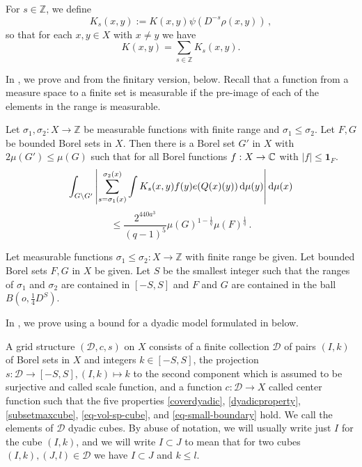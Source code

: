 For $s\in\mathbb{Z}$, we define
\begin{equation}\label{defks}
    K_s(x,y):=K(x,y)\psi(D^{-s}\rho(x,y))\,,
\end{equation}
so that for each $x, y \in X$ with $x\neq y$ we have
$$K(x,y)=\sum_{s\in\mathbb{Z}}K_s(x,y).$$

In , we prove  and 
from the finitary version,  below. Recall
that a function from a measure space to a finite set is measurable if the pre-image of each of the elements in the range is measurable.


\begin{proposition}
\label{finitary-Carleson}
\leanok
{}
Let ${\sigma_1},\sigma_2\colon X\to \mathbb{Z}$ be measurable functions with finite range and ${\sigma_1}\leq \sigma_2$.  Let $F,G$ be bounded Borel sets in $X$. Then there is a Borel set $G'$ in $X$ with $2\mu(G')\leq \mu(G)$ such that
for all Borel functions $f:X\to {\mathbb{C}}$ with $|f|\le \mathbf{1}_F$.
\begin{equation*}
    \int_{G \setminus G'} \left|\sum_{s={\sigma_1}(x)}^{{\sigma_2}(x)} \int K_s(x,y) f(y) e({Q}(x)(y)) \, \mathrm{d}\mu(y) \right| \mathrm{d}\mu(x)
\end{equation*}
\begin{equation}
    \label{eq-linearized}
    \le \frac{2^{440a^3}}{(q-1)^5} \mu(G)^{1-\frac{1}{q}}
     \mu(F)^{\frac 1 q}\,.
\end{equation}
\end{proposition}
Let measurable functions ${\sigma_1}\leq \sigma_2\colon X\to \mathbb{Z}$ with finite range be given.
Let bounded Borel sets $F,G$ in $X$ be given.
Let $S$ be the smallest integer such that the ranges of
$\sigma_1$ and $\sigma_2$ are contained in $[-S,S]$ and $F$ and $G$ are contained
in the ball $B(o, \frac{1}{4}D^S)$.

In , we prove  using a
bound for a dyadic model formulated in  below.

A grid structure $(\mathcal{D}, c, s)$ on $X$ consists of a finite collection $\mathcal{D}$ of pairs $(I, k)$ of Borel
sets in $X$ and integers $k \in [-S, S]$, the projection $s\colon \mathcal{D}\to [-S, S], (I, k) \mapsto k$ to the second component which is assumed to be surjective and
called scale function, and a function $c:\mathcal{D}\to X$
called center function such that the five properties
\eqref{coverdyadic}, \eqref{dyadicproperty}, \eqref{subsetmaxcube},
\eqref{eq-vol-sp-cube}, and \eqref{eq-small-boundary} hold. We call the elements of $\mathcal{D}$ dyadic cubes. By abuse of notation, we will usually write just $I$ for the cube $(I,k)$, and we will write $I \subset J$ to mean that for two cubes $(I,k), (J, l) \in \mathcal{D}$ we have $I \subset J$ and $k \le l$.

